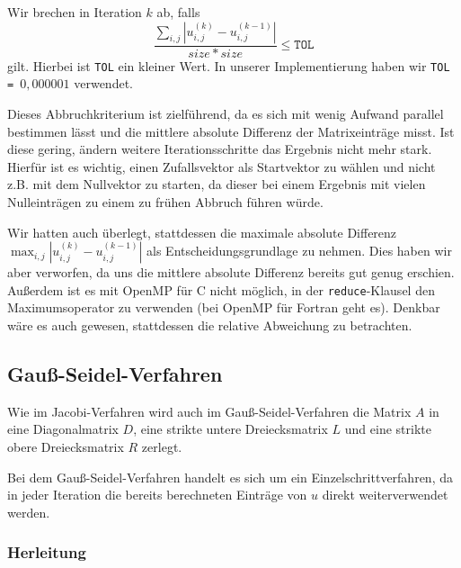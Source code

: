 \documentclass{article}
\begin{document}
Wir brechen in Iteration $k$ ab, falls
$$\frac{\sum_{i,j} {| u_{i,j}^{(k)} - u_{i,j}^{(k-1)} |}}{size * size} \leq \texttt{TOL}$$
gilt. Hierbei ist \texttt{TOL} ein kleiner Wert. In unserer Implementierung haben wir \texttt{TOL = $0,000001$} verwendet.

Dieses Abbruchkriterium ist zielführend, da es sich mit wenig Aufwand parallel bestimmen lässt und die mittlere absolute Differenz der Matrixeinträge misst. Ist diese gering, ändern weitere Iterationsschritte das Ergebnis nicht mehr stark. Hierfür ist es wichtig, einen Zufallsvektor als Startvektor zu wählen und nicht z.B. mit dem Nullvektor zu starten, da dieser bei einem Ergebnis mit vielen Nulleinträgen zu einem zu frühen Abbruch führen würde.

Wir hatten auch überlegt, stattdessen die maximale absolute Differenz $\max_{i,j} {| u_{i,j}^{(k)} - u_{i,j}^{(k-1)} |}$ als Entscheidungsgrundlage zu nehmen. Dies haben wir aber verworfen, da uns die mittlere absolute Differenz bereits gut genug erschien. Außerdem ist es mit OpenMP für C nicht möglich, in der \texttt{reduce}-Klausel den Maximumsoperator zu verwenden (bei OpenMP für Fortran geht es). Denkbar wäre es auch gewesen, stattdessen die relative Abweichung zu betrachten.

\subsection{Gauß-Seidel-Verfahren}
Wie im Jacobi-Verfahren wird auch im Gauß-Seidel-Verfahren die Matrix $A$ in eine Diagonalmatrix $D$, eine strikte untere Dreiecksmatrix $L$ und eine strikte obere Dreiecksmatrix $R$ zerlegt.

Bei dem Gauß-Seidel-Verfahren handelt es sich um ein Einzelschrittverfahren, da in jeder Iteration die bereits  berechneten Einträge von $u$ direkt weiterverwendet werden.
\subsubsection{Herleitung}
\end{document}
